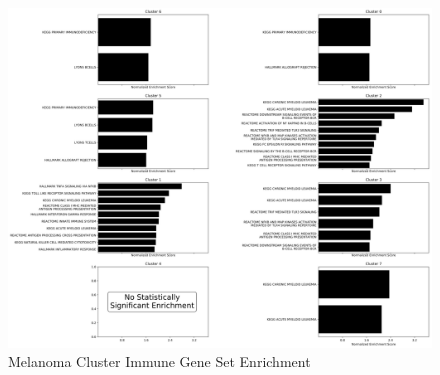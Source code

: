 \documentclass[fleqn,10pt]{wlscirep}
\begin{document}

\begin{figure}
	\centering
	\includegraphics[width=0.75\linewidth]{images/melanoma-immune-subtype-enrichment.png}
	\caption{Melanoma Cluster Immune Gene Set Enrichment}
	\label{sfig:melanoma-gsea}
\end{figure}
\end{document}
